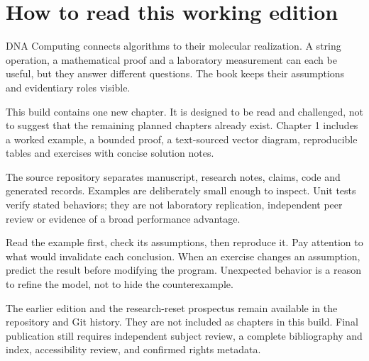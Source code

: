 \chapter*{How to read this working edition}

DNA Computing connects algorithms to their molecular realization. A string operation, a mathematical proof and a laboratory measurement can each be useful, but they answer different questions. The book keeps their assumptions and evidentiary roles visible.

This build contains one new chapter. It is designed to be read and challenged,
not to suggest that the remaining planned chapters already exist. Chapter 1
includes a worked example, a bounded proof, a text-sourced vector diagram,
reproducible tables and exercises with concise solution notes.

The source repository separates manuscript, research notes, claims, code and
generated records. Examples are deliberately small enough to inspect. Unit
tests verify stated behaviors; they are not laboratory replication, independent
peer review or evidence of a broad performance advantage.

Read the example first, check its assumptions, then reproduce it. Pay attention
to what would invalidate each conclusion. When an exercise changes an
assumption, predict the result before modifying the program. Unexpected
behavior is a reason to refine the model, not to hide the counterexample.

The earlier edition and the research-reset prospectus remain available in the
repository and Git history. They are not included as chapters in this build.
Final publication still requires independent subject review, a complete
bibliography and index, accessibility review, and confirmed rights metadata.
